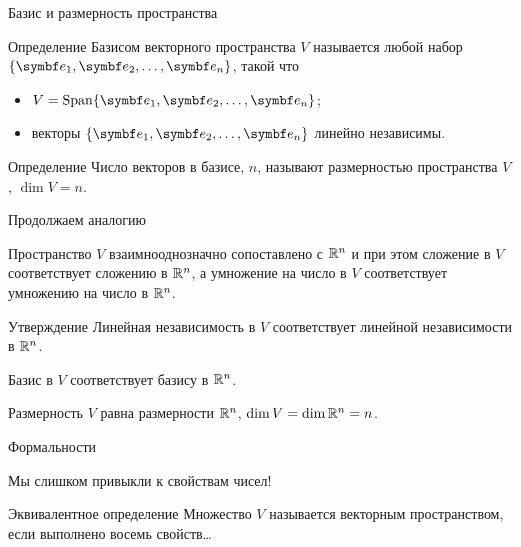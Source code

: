 \begin{frame}{Базис и размерность пространства}

\begin{block}{Определение}
\alert{Базисом векторного пространства} $V$ называется любой набор $\{\be_1, \be_2, \ldots, \be_n\}$,
такой что 
\begin{itemize}
    \item $V = \Span \{\be_1, \be_2, \ldots, \be_n\}$;
    \item векторы $\{\be_1, \be_2, \ldots, \be_n\}$ линейно независимы. 
\end{itemize}
\end{block}

\pause
\begin{block}{Определение}
Число  векторов в базисе, $n$, называют \alert{размерностью пространства} $V$, $\dim V = n$.
\end{block}

\end{frame}


\begin{frame}{Продолжаем аналогию}



Пространство $V$ взаимнооднозначно сопоставлено с $\mathbb{R}^n$ и при этом сложение в $V$ 
соответствует сложению в $\mathbb{R}^n$, 
а умножение на число в $V$ соответствует умножению на число в $\mathbb{R}^n$.
 


\begin{block}{Утверждение}
Линейная независимость в $V$ соответствует линейной независимости в $\mathbb{R}^n$.

Базис в $V$ соответствует базису в $\mathbb{R}^n$.

Размерность $V$ равна размерности $\mathbb{R}^n$, $\dim V = \dim \mathbb{R}^n = n$. 
\end{block}


\end{frame}



\begin{frame}{Формальности}

Мы слишком привыкли к свойствам чисел!

\pause

\vspace{40pt}

\begin{block}{Эквивалентное определение}
Множество $V$ называется \alert{векторным пространством}, если выполнено восемь свойств\ldots
\end{block}

\end{frame}

